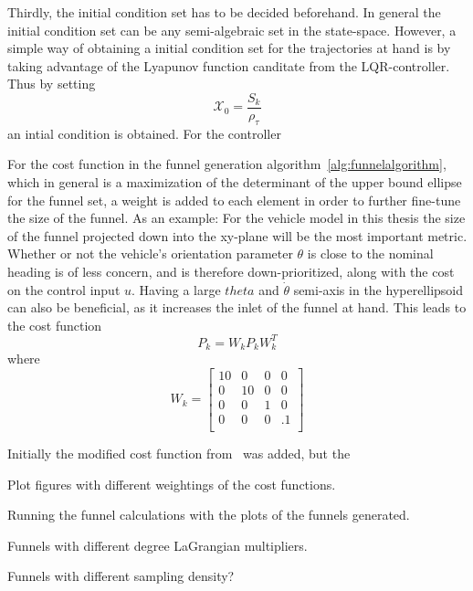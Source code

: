 Thirdly, the initial condition set has to be decided beforehand. In general the
initial condition set can be any semi-algebraic set in the state-space. However,
a simple way of obtaining a initial condition set for the trajectories at hand
is by taking advantage of the Lyapunov function canditate from the
\ac{LQR}-controller. Thus by setting
\begin{equation}
  \mathcal{X}_{0} = \frac{S_{k}}{\rho_{\tau}}
\end{equation}
an intial condition is obtained. For the controller 

For the cost function in the funnel generation
algorithm~\ref{alg:funnelalgorithm}, which in general is a maximization of the
determinant of the upper bound ellipse for the funnel set, a weight is added to
each element in order to further fine-tune the size of the funnel. As an example: For the
vehicle model in this thesis the size of the funnel projected down into the
xy-plane will be the most important metric. Whether or not the vehicle's
orientation parameter \(\theta\) is  close to the nominal heading is of less
concern, and is therefore down-prioritized, along with the cost on the control
input \(u\). Having a large \(theta\) and \(\dot{\theta}\) semi-axis in the
hyperellipsoid can also be beneficial, as it increases the inlet of the funnel
at hand. This leads to the cost function
\begin{equation}
  P_{k} = W_{k}P_{k}W_{k}^{T}
\end{equation}
where
\begin{equation}
  W_{k} =
  \begin{bmatrix}
    10 & 0 & 0 & 0 \\
    0 & 10 & 0 & 0 \\
    0 & 0 & 1 & 0 \\
    0 & 0 & 0 & .1 \\
  \end{bmatrix}
\end{equation}

Initially the modified cost function
from~\cite{majumdarFunnelLibrariesRealtime2017} was added, but the 

Plot figures with different weightings of the cost functions.

Running the funnel calculations with the plots of the funnels generated.

Funnels with different degree LaGrangian multipliers.

Funnels with different sampling density?

